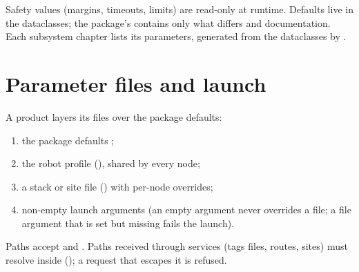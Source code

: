 Safety values (margins, timeouts, limits) are read-only at runtime. Defaults live in the
dataclasses; the package's  contains only what differs and
documentation. Each subsystem chapter lists its parameters, generated from the dataclasses by
.

\section{Parameter files and launch}
\label{sec:launch}

A product layers its files over the package defaults:
\begin{enumerate}
  \item the package defaults ;
  \item the robot profile (), shared by every node;
  \item a stack or site file () with per-node overrides;
  \item non-empty launch arguments (an empty argument never overrides a file; a file argument
    that is set but missing fails the launch).
\end{enumerate}

Paths accept \code{~} and . Paths received through services (tags files, routes,
sites) must resolve inside  (); a request
that escapes it is refused.
